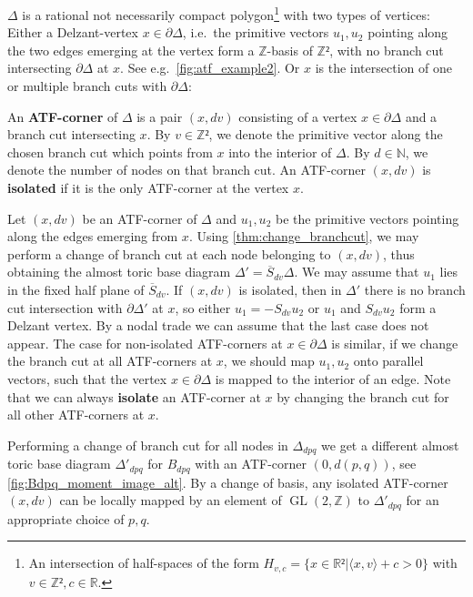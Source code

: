 \documentclass[12pt,a4paper,abstract=true,final]{scrartcl}
\DeclareMathOperator{\GL}{GL}
\begin{document}
$Δ$ is a rational not necessarily compact polygon\footnote{An intersection of half-spaces of the form $H_{v,c} = \{x ∈ ℝ² | ⟨x,v⟩+c > 0\}$ with $v ∈ ℤ², c ∈ ℝ$.} with two types of vertices: Either a Delzant-vertex $x ∈ ∂Δ$, i.e.\ the primitive vectors $u_1,u_2$ pointing along the two edges emerging at the vertex form a $ℤ$-basis of $ℤ²$, with no branch cut intersecting $∂Δ$ at $x$. See e.g.\ \cref{fig:atf_example2}.
Or $x$ is the intersection of one or multiple branch cuts with $∂Δ$:

\begin{definition}
  \label{def:atf_corner}
  An \textbf{ATF-corner} of $Δ$ is a pair $(x,dv)$ consisting of a vertex $x ∈ ∂Δ$ and a branch cut intersecting $x$.
  By $v ∈ ℤ²$, we denote the primitive vector along the chosen branch cut which points from $x$ into the interior of $\Delta$.
  By $d \in \mathbb{N}$, we denote the number of nodes on that branch cut.
An ATF-corner $(x,dv)$ is \textbf{isolated} if it is the only ATF-corner at the vertex $x$. 
\end{definition}

Let $(x,dv)$ be an ATF-corner of $Δ$ and $u_1,u_2$ be the primitive vectors pointing along the edges emerging from $x$.
Using \cref{thm:change_branchcut}, we may perform a change of branch cut at each node belonging to $(x,dv)$, thus obtaining the almost toric base diagram $Δ' = \overline{S}_{dv}Δ$.
We may assume that $u_1$ lies in the fixed half plane of $\overline{S}_{dv}$.
If $(x,dv)$ is isolated, then in $Δ'$ there is no branch cut intersection with $∂Δ'$ at $x$, so either $u_1 = -S_{dv}u_2$ or $u_1$ and $S_{dv}u_2$ form a Delzant vertex.
By a nodal trade we can assume that the last case does not appear.
The case for non-isolated ATF-corners at $x ∈ ∂Δ$ is similar, if we change the branch cut at all ATF-corners at $x$, we should map $u_1,u_2$ onto parallel vectors, such that the vertex $x ∈ ∂Δ$ is mapped to the interior of an edge.
Note that we can always \textbf{isolate} an ATF-corner at $x$ by changing the branch cut for all other ATF-corners at $x$.

Performing a change of branch cut for all nodes in $Δ_{dpq}$ we get a different almost toric base diagram $Δ'_{dpq}$ for $B_{dpq}$ with an ATF-corner $(0,d(p,q))$, see \cref{fig:Bdpq_moment_image_alt}.
By a change of basis, any isolated ATF-corner $(x,dv)$ can be locally mapped by an element of $\GL(2,ℤ)$ to $Δ'_{dpq}$ for an appropriate choice of $p,q$.
\end{document}
